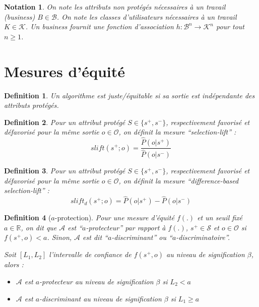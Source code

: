 \documentclass[draft]{article}
\newtheorem*{myNot}{Notation}
\newtheorem{myDef}{Definition}
\theoremstyle{definition}
\begin{document}
\begin{myNot}
  On note les attributs non protégés nécessaires à un travail (business) $B \in \mathcal{B}$.
  On note les classes d'utilisateurs nécessaires à un travail $K \in \mathcal{K}$.
  Un business fournit une fonction d'association $h : \mathcal{B}^{n} \rightarrow \mathcal{K}^{n}$ pour tout $n \geq 1$.
\end{myNot}



\section{Mesures d'équité}

\begin{myDef}
  \label{defSimple}
  Un algorithme est juste/équitable si sa sortie est indépendante des attributs protégés.
\end{myDef}

\begin{myDef}
  Pour un attribut protégé $S \in \{s^+, s^-\}$, respectivement favorisé et défavorisé pour la même sortie $o \in \mathcal{O}$, on définit la mesure ``selection-lift'' :
  \[
  slift(s^+;o) = \frac{\hat{P}(o|s^+)}{\hat{P}(o|s^-)}
  \]
\end{myDef}

\begin{myDef}
  Pour un attribut protégé $S \in \{s^+, s^-\}$, respectivement favorisé et défavorisé pour la même sortie $o \in \mathcal{O}$, on définit la mesure ``difference-based selection-lift'' :
  \[
  slift_{d}(s^+;o) = \hat{P}(o|s^+) - \hat{P}(o|s^-)
  \]
\end{myDef}

\begin{myDef}[$a$-protection]
  Pour une mesure d'équité $f(.)$ et un seuil fixé $a \in \mathbb{R}$, on dit que $\mathcal{A}$ est ``$a$-protecteur'' par rapport à $f(.)$, $s^{+} \in \mathcal{S}$ et $o \in \mathcal{O}$ si $f(s^{+},o) < a$. Sinon, $\mathcal{A}$ est dit ``$a$-discriminant'' ou ``$a$-discriminatoire''.

  Soit $\left[ L_{1} , L_{2} \right]$ l'intervalle de confiance de $f(s^{+},o)$ au niveau de signification $\beta$, alors :
  \begin{itemize}
  \item $\mathcal{A}$ est $a$-protecteur au niveau de signification $\beta$ si $L_{2} < a$
  \item $\mathcal{A}$ est $a$-discriminant au niveau de signification $\beta$ si $L_{1} \geq a$
  \end{itemize}
\end{myDef}
\end{document}

